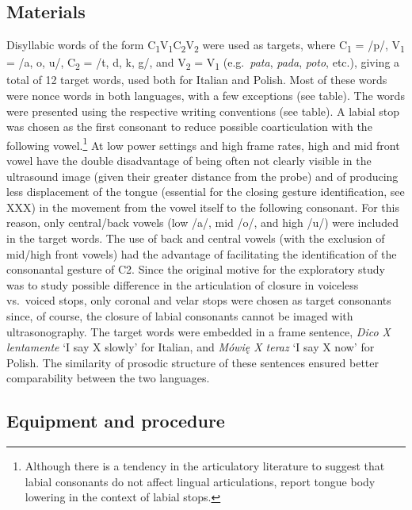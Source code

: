 \documentclass[]{article}
\let\rmarkdownfootnote\footnote%
\def\footnote{\protect\rmarkdownfootnote}
\begin{document}
\hypertarget{materials}{%
\subsection{Materials}\label{materials}}

Disyllabic words of the form
C\textsubscript{1}V\textsubscript{1}C\textsubscript{2}V\textsubscript{2}
were used as targets, where C\textsubscript{1} = /p/, V\textsubscript{1}
= /a, o, u/, C\textsubscript{2} = /t, d, k, g/, and V\textsubscript{2} =
V\textsubscript{1} (e.g.~\emph{pata}, \emph{pada}, \emph{poto}, etc.),
giving a total of 12 target words, used both for Italian and Polish.
Most of these words were nonce words in both languages, with a few
exceptions (see table). The words were presented using the respective
writing conventions (see table). A labial stop was chosen as the first
consonant to reduce possible coarticulation with the following
vowel.\footnote{Although there is a tendency in the articulatory literature to suggest that labial consonants do not affect lingual articulations, \citealt{vazquez-alvarez2007} report tongue body lowering in the context of labial stops.}
At low power settings and high frame rates, high and mid front vowel
have the double disadvantage of being often not clearly visible in the
ultrasound image (given their greater distance from the probe) and of
producing less displacement of the tongue (essential for the closing
gesture identification, see XXX) in the movement from the vowel itself
to the following consonant. For this reason, only central/back vowels
(low /a/, mid /o/, and high /u/) were included in the target words. The
use of back and central vowels (with the exclusion of mid/high front
vowels) had the advantage of facilitating the identification of the
consonantal gesture of C2. Since the original motive for the exploratory
study was to study possible difference in the articulation of closure in
voiceless vs.~voiced stops, only coronal and velar stops were chosen as
target consonants since, of course, the closure of labial consonants
cannot be imaged with ultrasonography. The target words were embedded in
a frame sentence, \emph{Dico X lentamente} `I say X slowly' for Italian,
and \emph{Mówię X teraz} `I say X now' for Polish. The similarity of
prosodic structure of these sentences ensured better comparability
between the two languages.

\hypertarget{equipment-and-procedure}{%
\subsection{Equipment and procedure}\label{equipment-and-procedure}}
\end{document}
